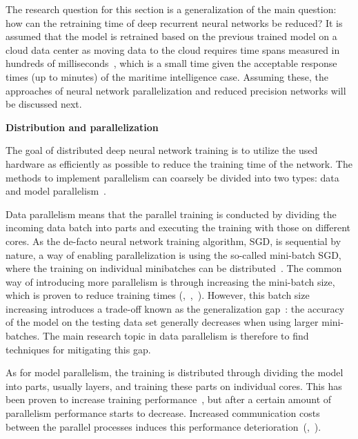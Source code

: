 The research question for this section is a generalization of the main question: how can the retraining time of deep recurrent neural networks be reduced? It is assumed that the model is retrained based on the previous trained model on a cloud data center as moving data to the cloud requires time spans measured in hundreds of milliseconds~\cite{edgelatency}, which is a small time given the acceptable response times (up to minutes) of the maritime intelligence case. Assuming these, the approaches of neural network parallelization and reduced precision networks will be discussed next.

\textbf{Distribution and parallelization}

The goal of distributed deep neural network training is to utilize the used hardware as efficiently as possible to reduce the training time of the network. The methods to implement parallelism can coarsely be divided into two types: data and model parallelism~\cite{ben-nunDemystifyingParallelDistributed2019}.

Data parallelism means that the parallel training is conducted by dividing the incoming data batch into parts and executing the training with those on different cores. As the de-facto neural network training algorithm, SGD, is sequential by nature, a way of enabling parallelization is using the so-called mini-batch SGD, where the training on individual minibatches can be distributed~\cite{DBLP:conf/icml/LeNCLPN11}. The common way of introducing more parallelism is through increasing the mini-batch size, which is proven to reduce training times (\cite{shallueMeasuringEffectsData2019},~\cite{goyalAccurateLargeMinibatch2018},~\cite{smithDonDecayLearning2018}). However, this batch size increasing introduces a trade-off known as the generalization gap~\cite{hofferTrainLongerGeneralize2018}: the accuracy of the model on the testing data set generally decreases when using larger mini-batches. The main research topic in data parallelism is therefore to find techniques for mitigating this gap.

As for model parallelism, the training is distributed through dividing the model into parts, usually layers, and training these parts on individual cores. This has been proven to increase training performance~\cite{ericsonPerformanceNetworkParallel2017}, but after a certain amount of parallelism performance starts to decrease. Increased communication costs between the parallel processes induces this performance deterioration~(\cite{ben-nunDemystifyingParallelDistributed2019},~\cite{ericsonPerformanceNetworkParallel2017}).

